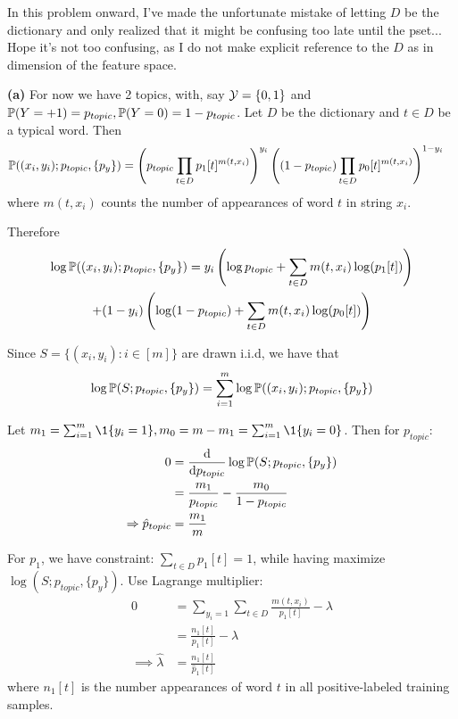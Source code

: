 \documentclass[a4paper, 11pt]{article}
\begin{document}
\begin{problem}
 In this problem onward, I've made the unfortunate mistake of letting $D$ be the dictionary and only realized that it might be confusing too late until the pset... Hope it's not too confusing, as I do not make explicit reference to the $D$ as in dimension of the feature space.

\textbf{(a)} For now we have 2 topics, with, say $\mathcal{Y} = \{0, 1\}$ and $\mathbb{P}(Y = +1) = p_{topic}, \mathbb{P}(Y = 0) = 1 - p_{topic}$. Let $D$ be the dictionary and $t \in D$ be a typical word.
Then \begin{align*}
\mathbb{P}((x_i, y_i); p_{topic}, \{p_y\}) &= \left(p_{topic} \prod_{t \in D} p_1[t]^{m(t, x_i)}\right)^{y_i} \left((1 - p_{topic} )\prod_{t \in D} p_0[t]^{m(t, x_i)}\right)^{1 - y_i}
\end{align*}
where $m(t, x_i)$ counts the number of appearances of word $t$ in string $x_i$.

Therefore \begin{multline*}
    \log \mathbb{P}((x_i, y_i); p_{topic}, \{p_y\})  = y_i \left(\log p_{topic} + \sum_{t \in D} m(t, x_i) \log(p_1[t])\right) \\
    + (1 -y_i) \left(\log (1 - p_{topic}) + \sum_{t \in D} m(t, x_i) \log(p_0[t])\right)
\end{multline*}

Since $S = \{(x_i, y_i) : i \in [m]\}$ are drawn i.i.d, we have that \begin{equation*}
\log \mathbb{P}(S; p_{topic}, \{p_y\}) = \sum_{i=1}^{m} \log \mathbb{P}((x_i, y_i); p_{topic}, \{p_y\})
\end{equation*}

Let $m_1 = \sum_{i=1}^{m} \1 \{y_i = 1\}, m_0 = m - m_1 = \sum_{i=1}^{m} \1 \{y_i = 0\}$. Then for $p_{topic}$:
\begin{align*}
    0 &=\frac{\mathrm{d}}{\mathrm{d} p_{topic}} \log \mathbb{P}(S; p_{topic}, \{p_y\}) \\
    &=\frac{m_1}{p_{topic}} -  \frac{m_0}{1-p_{topic}} \\
    \Rightarrow \hat{p}_{topic} &= \frac{m_1}{m}
\end{align*}

For $p_1$, we have constraint: $\sum_{t \in D} p_1[t] = 1$, while having maximize $\log(S; p_{topic}, \{p_y\})$. Use Lagrange multiplier:
\begin{align*}
    0 &= \sum_{y_i = 1} \sum_{t \in D} \frac{m(t, x_i)}{p_1[t]} - \lambda \\
    &= \frac{n_1[t]}{p_1[t]} - \lambda \\
    \implies \hat{\lambda} &= \frac{n_1[t]}{\hat{p}_1[t]}
\end{align*}
where $n_1[t]$ is the number appearances of word $t$ in all positive-labeled training samples.


\end{problem}
\end{document}
